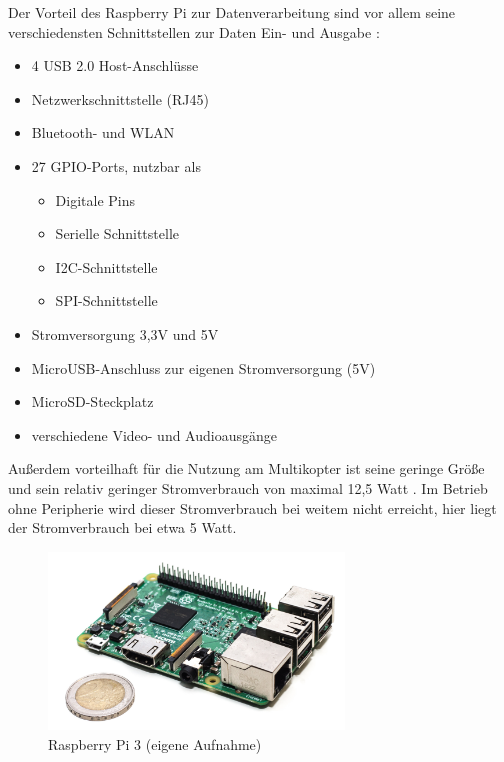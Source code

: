 \documentclass[a4paper,12pt,bibliography=totoc, listof=totoc,titlepage,pointlessnumbers]{scrreprt}
\begin{document}
Der Vorteil des Raspberry Pi zur Datenverarbeitung sind vor allem seine verschiedensten Schnittstellen zur Daten Ein- und Ausgabe \citep{raspSheet}:
\begin{itemize}
 \item 4 USB 2.0 Host-Anschlüsse
 \item Netzwerkschnittstelle (RJ45)
 \item Bluetooth- und WLAN
 \item 27 GPIO-Ports, nutzbar als \citep{ekRaspPin}
 \begin{itemize} 
  \item Digitale Pins
  \item Serielle Schnittstelle
  \item I2C-Schnittstelle
  \item SPI-Schnittstelle
 \end{itemize}
 \item Stromversorgung 3,3V und 5V
 \item MicroUSB-Anschluss zur eigenen Stromversorgung (5V)
 \item MicroSD-Steckplatz 
 \item verschiedene Video- und Audioausgänge
 \end{itemize}

Außerdem vorteilhaft für die Nutzung am Multikopter ist seine geringe Größe und sein relativ geringer Stromverbrauch von maximal 12,5 Watt \citep{raspSheet}. Im Betrieb ohne Peripherie wird dieser Stromverbrauch bei weitem nicht erreicht, hier liegt der Stromverbrauch bei etwa 5 Watt. 

\begin{figure}
 \centering
 \includegraphics[width=0.7\textwidth]{./img/rpi3.jpg}
 \caption{Raspberry Pi 3 (eigene Aufnahme)}
 \label{img:rpi3}
\end{figure}
\end{document}
